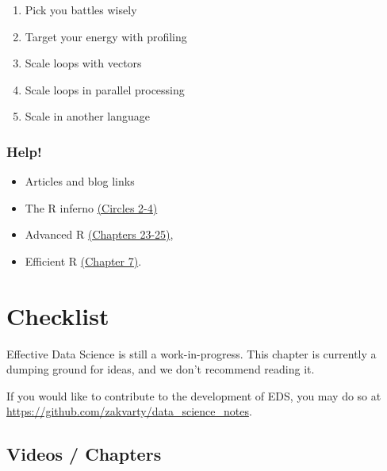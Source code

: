 \documentclass[
  12pt,
]{book}
\providecommand{\tightlist}{%
  \setlength{\itemsep}{0pt}\setlength{\parskip}{0pt}}
\begin{document}
\begin{enumerate}
\def\labelenumi{\arabic{enumi}.}
\tightlist
\item
  Pick you battles wisely
\item
  Target your energy with profiling
\item
  Scale loops with vectors
\item
  Scale loops in parallel processing
\item
  Scale in another language
\end{enumerate}

\hypertarget{help}{%
\subsection*{Help!}\label{help}}

\begin{itemize}
\tightlist
\item
  Articles and blog links
\item
  The R inferno \href{https://www.burns-stat.com/pages/Tutor/R_inferno.pdf}{(Circles 2-4)}
\item
  Advanced R \href{https://adv-r.hadley.nz/techniques.html}{(Chapters 23-25)},
\item
  Efficient R \href{https://csgillespie.github.io/efficientR/performance.html\#prerequisites-6}{(Chapter 7)}.
\end{itemize}

\hypertarget{production-checklist}{%
\chapter*{Checklist}\label{production-checklist}}

Effective Data Science is still a work-in-progress. This chapter is currently a dumping ground for ideas, and we don't recommend reading it.

If you would like to contribute to the development of EDS, you may do so at \url{https://github.com/zakvarty/data_science_notes}.

\hypertarget{videos-chapters-3}{%
\section{Videos / Chapters}\label{videos-chapters-3}}
\end{document}

